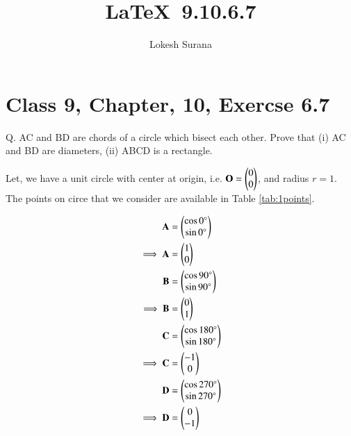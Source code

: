 \documentclass[journal,12pt,twocolumn]{IEEEtran}
\let\vec\mathbf
\begin{document}
\vspace{3cm}
\title{\LaTeX\ 9.10.6.7}
\author{Lokesh Surana}
\maketitle
\section*{Class 9, Chapter, 10, Exercse 6.7}

Q. AC and BD are chords of a circle which bisect each other. Prove that (i) AC and BD are diameters, (ii) ABCD is a rectangle.

\solution
Let, we have a unit circle with center at origin, i.e. $\vec{O} = \myvec{0\\0}$, and radius $r = 1$.
The points on circe that we consider are available in Table \eqref{tab:1points}.

\begin{table}[ht!]

\caption{}
\label{tab:points}
\end{table}

\begin{align}
    \vec{A} &= \myvec{\cos0\degree \\ \sin0\degree} \\
    \implies \vec{A} &= \myvec{1 \\ 0} \\
    \vec{B} &= \myvec{\cos90\degree \\ \sin90\degree} \\
    \implies \vec{B} &= \myvec{0 \\ 1} \\
    \vec{C} &= \myvec{\cos180\degree \\ \sin180\degree} \\
    \implies \vec{C} &= \myvec{-1 \\ 0} \\
    \vec{D} &= \myvec{\cos270\degree \\ \sin270\degree} \\
    \implies \vec{D} &= \myvec{0 \\ -1}
\end{align}
\end{document}

